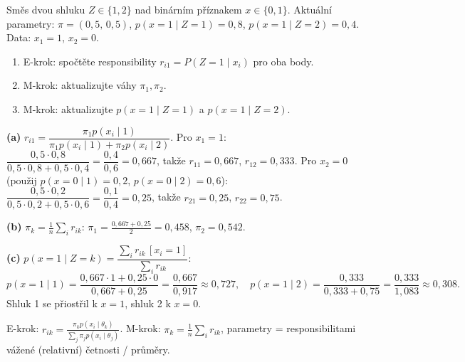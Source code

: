 \begin{zadani}
Směs dvou shluku $Z\in\{1,2\}$ nad binárním příznakem $x\in\{0,1\}$. Aktuální parametry: $\pi=(0{,}5,\,0{,}5)$, $p(x{=}1\mid Z{=}1)=0{,}8$, $p(x{=}1\mid Z{=}2)=0{,}4$. Data: $x_1=1$, $x_2=0$.
\begin{enumerate}[label=(\alph*)]
  \item {} E-krok: spočtěte responsibility $r_{i1}=P(Z{=}1\mid x_i)$ pro oba body.
  \item {} M-krok: aktualizujte váhy $\pi_1,\pi_2$.
  \item {} M-krok: aktualizujte $p(x{=}1\mid Z{=}1)$ a $p(x{=}1\mid Z{=}2)$.
\end{enumerate}
\end{zadani}

\begin{reseni}
\textbf{(a)} $r_{i1}=\dfrac{\pi_1 p(x_i\mid 1)}{\pi_1 p(x_i\mid 1)+\pi_2 p(x_i\mid 2)}$.
Pro $x_1{=}1$: $\dfrac{0{,}5\cdot0{,}8}{0{,}5\cdot0{,}8+0{,}5\cdot0{,}4}=\dfrac{0{,}4}{0{,}6}=0{,}667$, takže $r_{11}=0{,}667$, $r_{12}=0{,}333$.
Pro $x_2{=}0$ (použij $p(x{=}0\mid1)=0{,}2$, $p(x{=}0\mid2)=0{,}6$): $\dfrac{0{,}5\cdot0{,}2}{0{,}5\cdot0{,}2+0{,}5\cdot0{,}6}=\dfrac{0{,}1}{0{,}4}=0{,}25$, takže $r_{21}=0{,}25$, $r_{22}=0{,}75$.

\textbf{(b)} $\pi_k=\tfrac1n\sum_i r_{ik}$: $\pi_1=\tfrac{0{,}667+0{,}25}{2}=0{,}458$, $\pi_2=0{,}542$.

\textbf{(c)} $p(x{=}1\mid Z{=}k)=\dfrac{\sum_i r_{ik}\,[x_i{=}1]}{\sum_i r_{ik}}$:
\[
p(x{=}1\mid1)=\frac{0{,}667\cdot1+0{,}25\cdot0}{0{,}667+0{,}25}=\frac{0{,}667}{0{,}917}\approx0{,}727,\quad
p(x{=}1\mid2)=\frac{0{,}333}{0{,}333+0{,}75}=\frac{0{,}333}{1{,}083}\approx0{,}308.
\]
Shluk 1 se přiostřil k $x{=}1$, shluk 2 k $x{=}0$.
\end{reseni}

\begin{jadro}
E-krok: $r_{ik}=\frac{\pi_k p(x_i\mid\theta_k)}{\sum_j\pi_j p(x_i\mid\theta_j)}$. M-krok: $\pi_k=\frac1n\sum_i r_{ik}$, parametry = responsibilitami vážené (relativní) četnosti / průměry.
\end{jadro}

